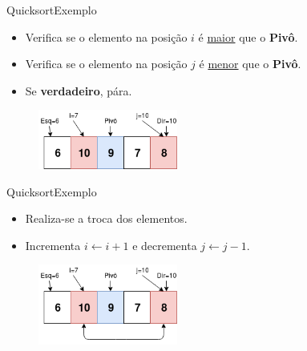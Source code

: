\documentclass[aspectratio=169]{beamer}
\begin{document}
\begin{frame}{Quicksort}{Exemplo}
\begin{itemize}
 \item Verifica se o elemento na posição $i$ é \underline{maior} que o {\bf Pivô}.
 \item Verifica se o elemento na posição $j$ é \underline{menor} que o {\bf Pivô}.
 \item Se {\bf verdadeiro}, pára.
\end{itemize}

\begin{figure}[!h]
  \centering
  \includegraphics[width=130pt]{imgs/quick/quick31.png}
  \label{fig_quick31}
\end{figure}

\end{frame}


\begin{frame}{Quicksort}{Exemplo}
\begin{itemize}
 \item Realiza-se a troca dos elementos.
 \item Incrementa $i\leftarrow i + 1$ e decrementa $j \leftarrow j - 1$.
\end{itemize}

\begin{figure}[!h]
  \centering
  \includegraphics[width=130pt]{imgs/quick/quick32.png}
  \label{fig_quick32}
\end{figure}

\end{frame}

\end{document}
